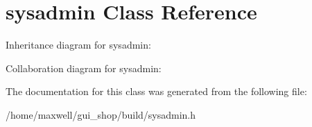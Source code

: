 \hypertarget{classsysadmin}{}\section{sysadmin Class Reference}
\label{classsysadmin}


Inheritance diagram for sysadmin\+:


Collaboration diagram for sysadmin\+:


The documentation for this class was generated from the following file\+:\begin{DoxyCompactItemize}
\item 
/home/maxwell/gui\+\_\+shop/build/sysadmin.\+h\end{DoxyCompactItemize}
